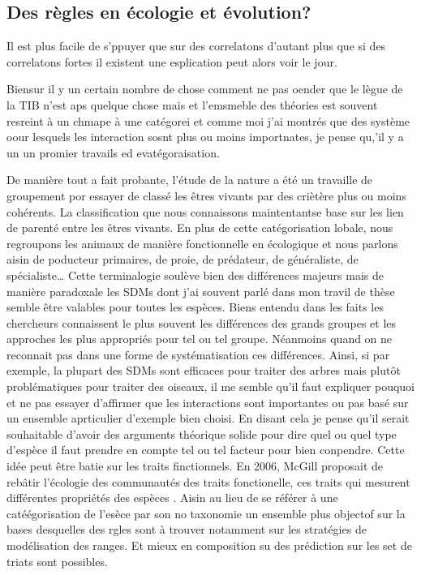 \subsection*{Des règles en écologie et
évolution?}\label{des-ruxe8gles-en-uxe9cologie-et-uxe9volution}

Il est plus facile de s'ppuyer que sur des correlatons d'autant plus que
si des correlatons fortes il existent une esplication peut alors voir le
jour.

Biensur il y un certain nombre de chose comment ne pas oender que le
lègue de la TIB n'est aps quelque chose mais et l'emsmeble des théories
est souvent resreint à un chmape à une catégorei et comme moi j'ai
montrés que des système oour lesquels les interaction sosnt plus ou
moins importnates, je pense qu,'il y a un un promier travails ed
evatégoraisation.

De manière tout a fait probante, l'étude de la nature a été un travaille
de groupement por essayer de classé les êtres vivants par des criètère
plus ou moins cohérents. La classification que nous connaissons
maintentantse base sur les lien de parenté entre les êtres vivants. En
plus de cette catégorisation lobale, nous regroupons les animaux de
manière fonctionnelle en écologique et nous parlons aisin de poducteur
primaires, de proie, de prédateur, de généraliste, de
spécialiste\ldots{} Cette terminalogie soulève bien des différences
majeurs mais de manière paradoxale les SDMs dont j'ai souvent parlé dans
mon travil de thèse semble être valables pour toutes les espèces. Biens
entendu dans les faits les chercheurs connaissent le plus souvent les
différences des grands groupes et les approches les plus appropriés pour
tel ou tel groupe. Néanmoins quand on ne reconnait pas dans une forme de
systématisation ces différences. Ainsi, si par exemple, la plupart des
SDMs sont efficaces pour traiter des arbres mais plutôt problématiques
pour traiter des oiseaux, il me semble qu'il faut expliquer pouquoi et
ne pas essayer d'affirmer que les interactions sont importantes ou pas
basé sur un ensemble aprticulier d'exemple bien choisi. En disant cela
je pense qu'il serait souhaitable d'avoir des arguments théorique solide
pour dire quel ou quel type d'espèce il faut prendre en compte tel ou
tel facteur pour bien conpendre. Cette idée peut être batie sur les
traits finctionnels. En 2006, McGill proposait de rebâtir l'écologie des
communautés des traits fonctionelle, ces traits qui mesurent différentes
propriétés des espèces \citep{McGill2006}. Aisin au lieu de se référer à
une catéégorisation de l'esèce par son no taxonomie un ensemble plus
objectof sur la bases desquelles des rgles sont à trouver notamment sur
les stratégies de modélisation des ranges. Et mieux en composition su
des prédiction sur les set de triats sont possibles.

